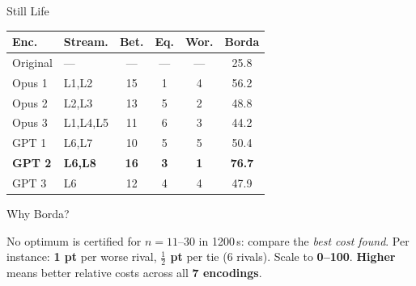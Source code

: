 \documentclass[10pt,aspectratio=169]{beamer}
\begin{document}
\begin{frame}[fragile]{Still Life}
\begin{tabular}{@{}llcccc@{}}
\toprule
Enc. & Stream. & Bet. & Eq. & Wor. & Borda \\
\midrule
Original & --- & --- & --- & --- & 25.8 \\
Opus 1 & L1,L2 & 15 & 1 & 4 & 56.2 \\
Opus 2 & L2,L3 & 13 & 5 & 2 & 48.8 \\
Opus 3 & L1,L4,L5 & 11 & 6 & 3 & 44.2 \\
GPT 1 & L6,L7 & 10 & 5 & 5 & 50.4 \\
\textbf{GPT 2} & \textbf{L6,L8} & \textbf{16} & \textbf{3} & \textbf{1} & \textbf{76.7} \\
GPT 3 & L6 & 12 & 4 & 4 & 47.9 \\
\bottomrule
\end{tabular}
\centering
\begin{block}{Why Borda?}
{\scriptsize\raggedright
No optimum is certified for $n=11$--$30$ in 1200\,s:
compare the \emph{best cost found}. Per instance: \textbf{1 pt} per worse rival, \textbf{$\frac12$ pt} per tie (6 rivals). Scale to \textbf{0--100}. \textbf{Higher} means better relative costs across all \textbf{7 encodings}.
\par}
\end{block}
\end{frame}
\end{document}
